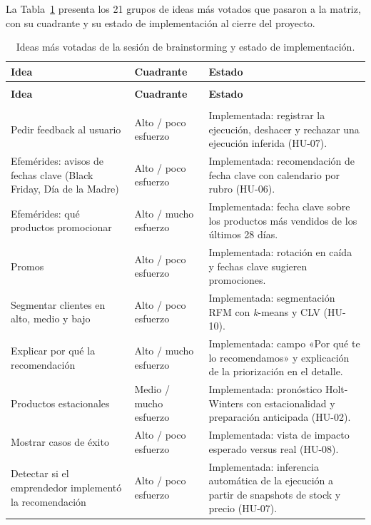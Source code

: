 La Tabla~\ref{tab:brainstorming-ideas} presenta los 21 grupos de ideas más votados que pasaron a la matriz, con su cuadrante y su estado de implementación al cierre del proyecto.

{\small
\begin{longtable}{>{\raggedright\arraybackslash}p{5cm} >{\raggedright\arraybackslash}p{2.6cm} >{\raggedright\arraybackslash}p{6.4cm}}
\caption{Ideas más votadas de la sesión de brainstorming y estado de implementación.}
\label{tab:brainstorming-ideas}\\
\hline
\textbf{Idea} & \textbf{Cuadrante} & \textbf{Estado} \\
\hline
\endfirsthead
\multicolumn{3}{l}{\textit{Continuación de la Tabla~\thetable}} \\
\hline
\textbf{Idea} & \textbf{Cuadrante} & \textbf{Estado} \\
\hline
\endhead
\hline
\endfoot
\multicolumn{3}{l}{\textit{Ideas que validan el diseño implementado}} \\
\hline
Pedir feedback al usuario & Alto / poco esfuerzo & Implementada: registrar la ejecución, deshacer y rechazar una ejecución inferida (HU-07). \\
Efemérides: avisos de fechas clave (Black Friday, Día de la Madre) & Alto / poco esfuerzo & Implementada: recomendación de fecha clave con calendario por rubro (HU-06). \\
Efemérides: qué productos promocionar & Alto / mucho esfuerzo & Implementada: fecha clave sobre los productos más vendidos de los últimos 28 días. \\
Promos & Alto / poco esfuerzo & Implementada: rotación en caída y fechas clave sugieren promociones. \\
Segmentar clientes en alto, medio y bajo & Alto / poco esfuerzo & Implementada: segmentación RFM con \emph{k}-means y CLV (HU-10). \\
Explicar por qué la recomendación & Alto / mucho esfuerzo & Implementada: campo «Por qué te lo recomendamos» y explicación de la priorización en el detalle. \\
Productos estacionales & Medio / mucho esfuerzo & Implementada: pronóstico Holt-Winters con estacionalidad y preparación anticipada (HU-02). \\
Mostrar casos de éxito & Alto / poco esfuerzo & Implementada: vista de impacto esperado versus real (HU-08). \\
Detectar si el emprendedor implementó la recomendación & Alto / poco esfuerzo & Implementada: inferencia automática de la ejecución a partir de snapshots de stock y precio (HU-07). \\

\end{longtable}}
